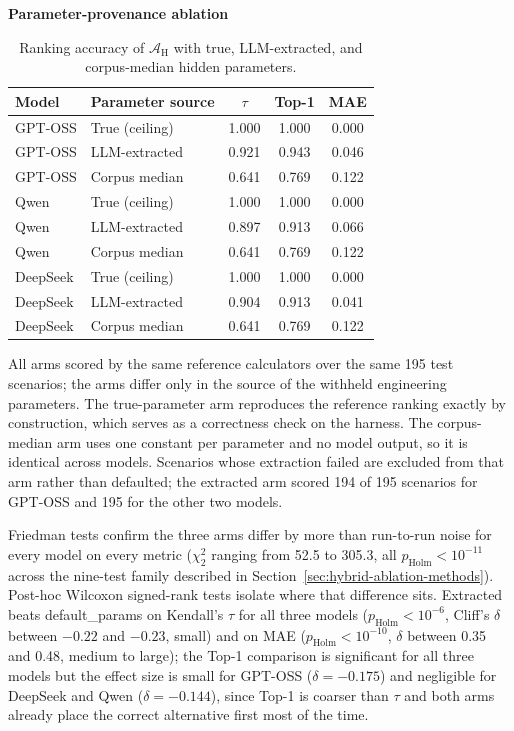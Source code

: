 \documentclass[final,3p,times]{elsarticle}
\begin{document}
\begin{table}[htbp]
\begin{threeparttable}
\footnotesize
\centering
\textbf{Parameter-provenance ablation}
\renewcommand{\arraystretch}{1.15}
\begin{tabular}{llccc}
\toprule
Model & Parameter source & $\tau$ & Top-1 & MAE \\
\midrule
GPT-OSS & True (ceiling) & 1.000 & 1.000 & 0.000 \\
GPT-OSS & LLM-extracted & 0.921 & 0.943 & 0.046 \\
GPT-OSS & Corpus median & 0.641 & 0.769 & 0.122 \\
\midrule
Qwen & True (ceiling) & 1.000 & 1.000 & 0.000 \\
Qwen & LLM-extracted & 0.897 & 0.913 & 0.066 \\
Qwen & Corpus median & 0.641 & 0.769 & 0.122 \\
\midrule
DeepSeek & True (ceiling) & 1.000 & 1.000 & 0.000 \\
DeepSeek & LLM-extracted & 0.904 & 0.913 & 0.041 \\
DeepSeek & Corpus median & 0.641 & 0.769 & 0.122 \\
\bottomrule
\end{tabular}
\renewcommand{\arraystretch}{1.0}
\begin{tablenotes}
\item All arms scored by the same reference calculators over the same 195 test scenarios; the arms differ only in the source of the withheld engineering parameters. The true-parameter arm reproduces the reference ranking exactly by construction, which serves as a correctness check on the harness. The corpus-median arm uses one constant per parameter and no model output, so it is identical across models. Scenarios whose extraction failed are excluded from that arm rather than defaulted; the extracted arm scored 194 of 195 scenarios for GPT-OSS and 195 for the other two models.
\end{tablenotes}
\caption{Ranking accuracy of $\mathcal{A}_{\text{H}}$ with true, LLM-extracted, and corpus-median hidden parameters.}
\label{tab:param_provenance}
\end{threeparttable}
\end{table}

Friedman tests confirm the three arms differ by more than run-to-run noise for every model on every metric ($\chi^2_2$ ranging from 52.5 to 305.3, all $p_{\text{Holm}} < 10^{-11}$ across the nine-test family described in Section~\ref{sec:hybrid-ablation-methods}). Post-hoc Wilcoxon signed-rank tests isolate where that difference sits. Extracted beats default\_params on Kendall's $\tau$ for all three models ($p_{\text{Holm}} < 10^{-6}$, Cliff's $\delta$ between $-0.22$ and $-0.23$, small) and on MAE ($p_{\text{Holm}} < 10^{-10}$, $\delta$ between 0.35 and 0.48, medium to large); the Top-1 comparison is significant for all three models but the effect size is small for GPT-OSS ($\delta=-0.175$) and negligible for DeepSeek and Qwen ($\delta=-0.144$), since Top-1 is coarser than $\tau$ and both arms already place the correct alternative first most of the time.
\end{document}
